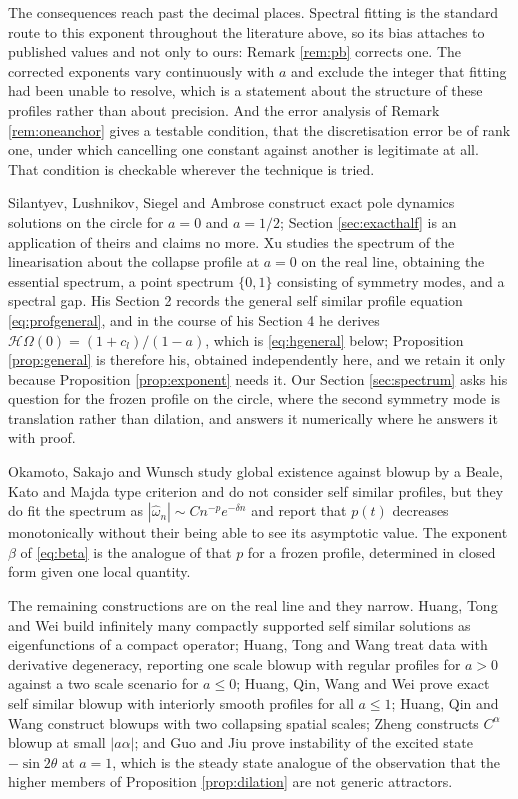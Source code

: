 \documentclass[11pt]{article}
\theoremstyle{definition}
\newcommand{\Hil}{\mathcal{H}}
\newcommand{\abs}[1]{\left\lvert #1 \right\rvert}
\begin{document}
The consequences reach past the decimal places. Spectral fitting is the
standard route to this exponent throughout the literature above, so its bias
attaches to published values and not only to ours: Remark \ref{rem:pb} corrects
one. The corrected exponents vary continuously with $a$ and exclude the integer
that fitting had been unable to resolve, which is a statement about the
structure of these profiles rather than about precision. And the error analysis
of Remark \ref{rem:oneanchor} gives a testable condition, that the
discretisation error be of rank one, under which cancelling one constant
against another is legitimate at all. That condition is checkable wherever the
technique is tried.

Silantyev, Lushnikov, Siegel and Ambrose \cite{slsa2025} construct exact pole
dynamics solutions on the circle for $a=0$ and $a=1/2$; Section
\ref{sec:exacthalf} is an application of theirs and claims no more. Xu
\cite{xu2026} studies the spectrum of the linearisation about the collapse
profile at $a=0$ on the real line, obtaining the essential spectrum, a point
spectrum $\{0,1\}$ consisting of symmetry modes, and a spectral gap. His
Section 2 records the general self similar profile equation
\eqref{eq:profgeneral}, and in the course of his Section 4 he derives
$\Hil\Omega(0) = (1+c_l)/(1-a)$, which is \eqref{eq:hgeneral} below;
Proposition \ref{prop:general} is therefore his, obtained independently here,
and we retain it only because Proposition \ref{prop:exponent} needs it. Our
Section \ref{sec:spectrum} asks his question for the frozen profile on the
circle, where the second symmetry mode is translation rather than dilation, and
answers it numerically where he answers it with proof.

Okamoto, Sakajo and Wunsch \cite{osw2008} study global existence against blowup
by a Beale, Kato and Majda type criterion and do not consider self similar
profiles, but they do fit the spectrum as
$\abs{\hat\omega_n} \sim Cn^{-p}e^{-\delta n}$ and report that $p(t)$ decreases
monotonically without their being able to see its asymptotic value. The
exponent $\beta$ of \eqref{eq:beta} is the analogue of that $p$ for a frozen
profile, determined in closed form given one local quantity.

The remaining constructions are on the real line and they narrow. Huang, Tong
and Wei \cite{htw2022} build infinitely many compactly supported self similar
solutions as eigenfunctions of a compact operator; Huang, Tong and Wang
\cite{htw2026} treat data with derivative degeneracy, reporting one scale
blowup with regular profiles for $a>0$ against a two scale scenario for
$a\le0$; Huang, Qin, Wang and Wei \cite{hqww2023} prove exact self similar
blowup with interiorly smooth profiles for all $a\le1$; Huang, Qin and Wang
\cite{hqw2024} construct blowups with two collapsing spatial scales; Zheng
\cite{zheng2023} constructs $C^\alpha$ blowup at small $\abs{a\alpha}$; and Guo
and Jiu \cite{gj2025} prove instability of the excited state $-\sin2\theta$ at
$a=1$, which is the steady state analogue of the observation that the higher
members of Proposition \ref{prop:dilation} are not generic attractors.
\end{document}
